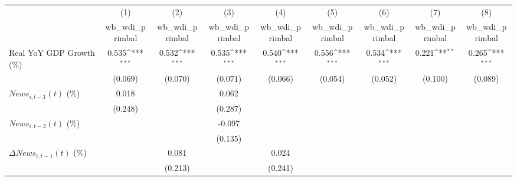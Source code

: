 {
\def\sym#1{\ifmmode^{#1}\else\(^{#1}\)\fi}
\begin{tabular}{l*{8}{c}}
\toprule
                    &\multicolumn{1}{c}{(1)}&\multicolumn{1}{c}{(2)}&\multicolumn{1}{c}{(3)}&\multicolumn{1}{c}{(4)}&\multicolumn{1}{c}{(5)}&\multicolumn{1}{c}{(6)}&\multicolumn{1}{c}{(7)}&\multicolumn{1}{c}{(8)}\\
                    &\multicolumn{1}{c}{wb_wdi_primbal}&\multicolumn{1}{c}{wb_wdi_primbal}&\multicolumn{1}{c}{wb_wdi_primbal}&\multicolumn{1}{c}{wb_wdi_primbal}&\multicolumn{1}{c}{wb_wdi_primbal}&\multicolumn{1}{c}{wb_wdi_primbal}&\multicolumn{1}{c}{wb_wdi_primbal}&\multicolumn{1}{c}{wb_wdi_primbal}\\
\midrule
Real YoY GDP Growth (\%)&       0.535\sym{***}&       0.532\sym{***}&       0.535\sym{***}&       0.540\sym{***}&       0.556\sym{***}&       0.534\sym{***}&       0.221\sym{**} &       0.265\sym{***}\\
                    &     (0.069)         &     (0.070)         &     (0.071)         &     (0.066)         &     (0.054)         &     (0.052)         &     (0.100)         &     (0.089)         \\
\addlinespace
$ News_{i,t-1}(t)$ (\%)&       0.018         &                     &       0.062         &                     &                     &                     &                     &                     \\
                    &     (0.248)         &                     &     (0.287)         &                     &                     &                     &                     &                     \\
\addlinespace
$ News_{i,t-2}(t)$ (\%)&                     &                     &      -0.097         &                     &                     &                     &                     &                     \\
                    &                     &                     &     (0.135)         &                     &                     &                     &                     &                     \\
\addlinespace
$ \Delta News_{i,t-1}(t)$ (\%)&                     &       0.081         &                     &       0.024         &                     &                     &                     &                     \\
                    &                     &     (0.213)         &                     &     (0.241)         &                     &                     &                     &                     \\

\end{tabular}}
